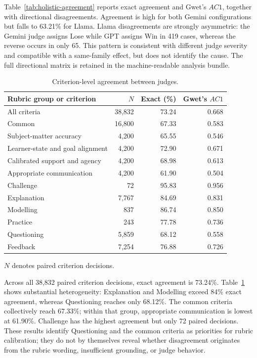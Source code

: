 \documentclass[conference]{IEEEtran}
\begin{document}
Table~\ref{tab:holistic-agreement} reports exact agreement and Gwet's
\(AC1\), together with directional disagreements. Agreement is high for both
Gemini configurations but falls to 63.21\% for Llama. Llama disagreements are
strongly asymmetric: the Gemini judge assigns Lose while GPT assigns Win in
419 cases, whereas the reverse occurs in only 65. This pattern is consistent
with different judge severity and compatible with a same-family effect, but
does not identify the cause. The full directional matrix is retained in the
machine-readable analysis bundle.

\begin{table}[t]
\caption{Criterion-level agreement between judges.}
\label{tab:criterion-agreement}
\centering
\footnotesize
\setlength{\tabcolsep}{2pt}
\renewcommand{\arraystretch}{0.88}
\begin{tabular}{@{}p{}rrr@{}}
\hline
Rubric group or criterion & \(N\) & Exact (\%) & Gwet's \(AC1\) \\
\hline
All criteria & 38,832 & 73.24 & 0.668 \\
Common & 16,800 & 67.33 & 0.583 \\
\quad Subject-matter accuracy & 4,200 & 65.55 & 0.546 \\
\quad Learner-state and goal alignment & 4,200 & 72.90 & 0.671 \\
\quad Calibrated support and agency & 4,200 & 68.98 & 0.613 \\
\quad Appropriate communication & 4,200 & 61.90 & 0.504 \\
Challenge & 72 & 95.83 & 0.956 \\
Explanation & 7,767 & 84.69 & 0.831 \\
Modelling & 837 & 86.74 & 0.850 \\
Practice & 243 & 77.78 & 0.736 \\
Questioning & 5,859 & 68.12 & 0.558 \\
Feedback & 7,254 & 76.88 & 0.726 \\
\hline
\end{tabular}
\footnotesize \(N\) denotes paired criterion decisions.
\end{table}

Across all 38,832 paired criterion decisions, exact agreement is 73.24\%.
Table~\ref{tab:criterion-agreement} shows substantial heterogeneity:
Explanation and Modelling exceed 84\% exact agreement, whereas Questioning
reaches only 68.12\%. The common criteria collectively reach 67.33\%; within
that group, appropriate communication is lowest at 61.90\%. Challenge has the
highest agreement but only 72 paired decisions. These results identify
Questioning and the common criteria as priorities for rubric calibration;
they do not by themselves reveal whether disagreement originates from the
rubric wording, insufficient grounding, or judge behavior.
\end{document}
